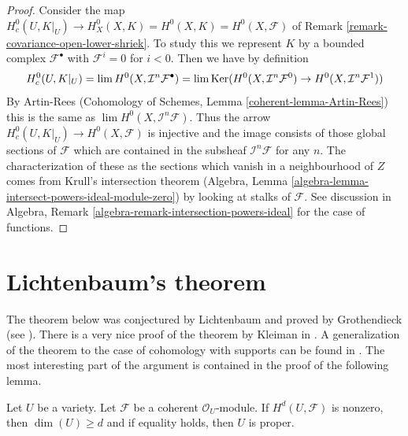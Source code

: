 \begin{proof}
Consider the map
$H^0_c(U, K|_U) \to H^0_X(X, K) = H^0(X, K) = H^0(X, \mathcal{F})$ of
Remark \ref{remark-covariance-open-lower-shriek}. To study this
we represent $K$ by a bounded complex $\mathcal{F}^\bullet$ with
$\mathcal{F}^i = 0$ for $i < 0$. Then we have by definition
$$
H^0_c(U, K|_U) = \mathop{\mathrm{lim}}\nolimits H^0(X, \mathcal{I}^n\mathcal{F}^\bullet)
= \mathop{\mathrm{lim}}\nolimits \mathop{\mathrm{Ker}}(
H^0(X, \mathcal{I}^n\mathcal{F}^0) \to
H^0(X, \mathcal{I}^n\mathcal{F}^1))
$$
By Artin-Rees (Cohomology of Schemes, Lemma \ref{coherent-lemma-Artin-Rees})
this is the same as $\lim H^0(X, \mathcal{I}^n\mathcal{F})$.
Thus the arrow $H^0_c(U, K|_U) \to H^0(X, \mathcal{F})$
is injective and the image consists of those global sections of $\mathcal{F}$
which are contained in the subsheaf $\mathcal{I}^n\mathcal{F}$
for any $n$. The characterization of these as the sections which
vanish in a neighbourhood of $Z$ comes from Krull's intersection
theorem (Algebra, Lemma \ref{algebra-lemma-intersect-powers-ideal-module-zero})
by looking at stalks of $\mathcal{F}$. See discussion in
Algebra, Remark \ref{algebra-remark-intersection-powers-ideal}
for the case of functions.
\end{proof}




\section{Lichtenbaum's theorem}
\label{section-lichtenbaum}

\noindent
The theorem below was conjectured by Lichtenbaum and proved by Grothendieck
(see \cite{Hartshorne-local-cohomology}). There is a very nice proof of the
theorem by Kleiman in \cite{Kleiman-Lichtenbaum}. A generalization of
the theorem to the case of cohomology with supports can be found in
\cite{Lyubeznik-Lichtenbaum}. The most interesting part of the argument
is contained in the proof of the following lemma.

\begin{lemma}
\label{lemma-lichtenbaum}
Let $U$ be a variety. Let $\mathcal{F}$ be a coherent $\mathcal{O}_U$-module.
If $H^d(U, \mathcal{F})$ is nonzero, then $\dim(U) \geq d$ and if
equality holds, then $U$ is proper.
\end{lemma}

